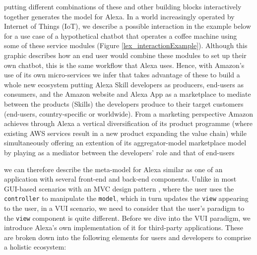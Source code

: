 putting different combinations of these and other building blocks interactively together generates the model for Alexa. In a world increasingly operated by Internet of Things (IoT), we describe a possible interaction in the example below for a use case of a hypothetical chatbot that operates a coffee machine using some of these service modules (Figure \ref{lex_interactionExample}).  Although this graphic describes how an end user would combine these modules to set up their own chatbot, this is the same workflow that Alexa uses. Hence, with Amazon's use of its own micro-services we infer that takes advantage of these to build a whole new ecosystem putting Alexa Skill developers as producers, end-users as consumers, and the Amazon website and Alexa App as a marketplace to mediate between the products (Skills) the developers produce to their target customers (end-users, country-specific or worldwide). From a marketing perspective Amazon achieves through Alexa a vertical diversification of its product programme (where existing AWS services result in a new product expanding the value chain) while simultaneously offering an extention of its aggregator-model marketplace model by playing as a mediator between the developers' role and that of end-users %




we can therefore describe the meta-model for Alexa similar as one %
of an application with several front-end and back-end components. Unlike in most GUI-based scenarios with an MVC design pattern \cite{wiki:mvc}, where the user uses the \lstinline|controller| to manipulate the \lstinline|model|, which in turn updates the \lstinline|view| appearing to the user, in a VUI scenario, we need to consider that the user's paradigm to the \lstinline|view| component is quite different. Before we dive into the VUI paradigm, we introduce Alexa's own implementation of it for third-party applications. These are broken down into the following elements for users and developers to comprise a holistic ecosystem:




